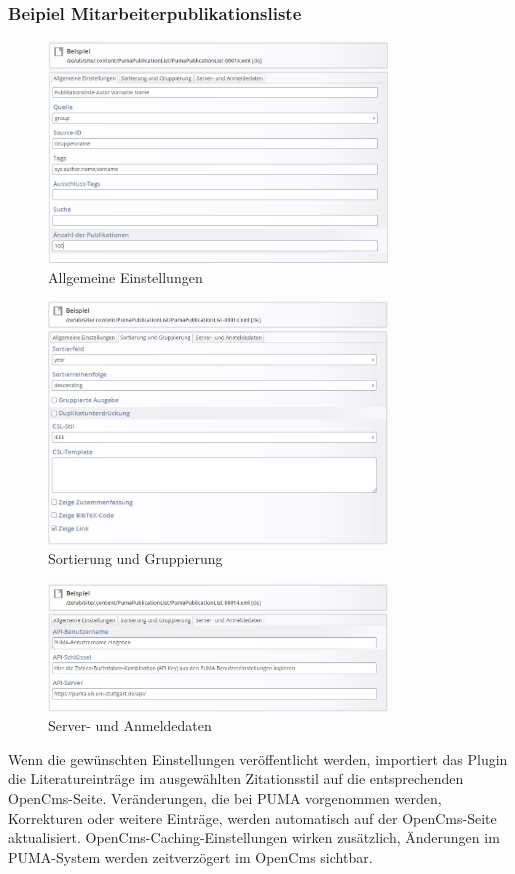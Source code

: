 \subsubsection*{Beipiel Mitarbeiterpublikationsliste}\label{sss:mpl}
\begin{figure}[h!]
 \centering
 \includegraphics[width=9cm]{Bilder/Kapitel9/Mitarbeiterliste1.jpeg}
 \caption{Allgemeine Einstellungen}
 \label{fig:mplAllgemeineEinstellungen}
\end{figure}
\begin{figure}[h!]
 \centering
 \includegraphics[width=9cm]{Bilder/Kapitel9/Mitarbeiterliste2.jpeg}
 \caption{Sortierung und Gruppierung}
 \label{fig:mplSortierungGruppierung}
\end{figure}
\begin{figure}[h!]
 \centering
 \includegraphics[width=9cm]{Bilder/Kapitel9/Mitarbeiterliste3.jpeg}
 \caption{Server- und Anmeldedaten}
 \label{fig:mplServerAnmeldedaten}
\end{figure}
Wenn die gewünschten Einstellungen veröffentlicht werden, importiert das Plugin die Literatureinträge im ausgewählten Zitationsstil auf die entsprechenden OpenCms-Seite. Veränderungen, die bei PUMA vorgenommen werden, Korrekturen oder weitere Einträge, werden automatisch auf der OpenCms-Seite aktualisiert. OpenCms-Caching-Einstellungen wirken zusätzlich, Änderungen im PUMA-System werden zeitverzögert im OpenCms sichtbar.
